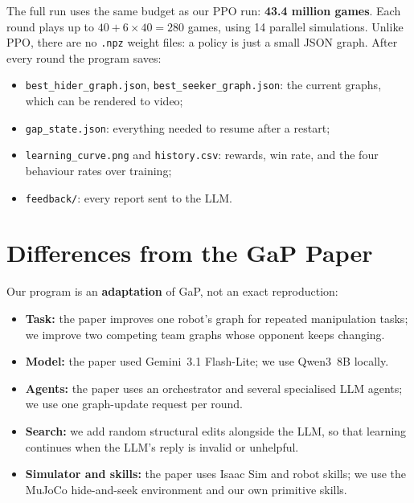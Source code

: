 \documentclass[11pt]{article}
\begin{document}
The full run uses the same budget as our PPO run: \textbf{43.4 million games}.
Each round plays up to $40 + 6 \times 40 = 280$ games, using 14 parallel
simulations. Unlike PPO, there are no \texttt{.npz} weight files: a policy is just
a small JSON graph. After every round the program saves:
\begin{itemize}
  \item \texttt{best\_hider\_graph.json}, \texttt{best\_seeker\_graph.json}: the
  current graphs, which can be rendered to video;
  \item \texttt{gap\_state.json}: everything needed to resume after a restart;
  \item \texttt{learning\_curve.png} and \texttt{history.csv}: rewards, win rate,
  and the four behaviour rates over training;
  \item \texttt{feedback/}: every report sent to the LLM.
\end{itemize}

\section{Differences from the GaP Paper}

Our program is an \textbf{adaptation} of GaP, not an exact reproduction:
\begin{itemize}
  \item \textbf{Task:} the paper improves one robot's graph for repeated
  manipulation tasks; we improve two competing team graphs whose opponent keeps
  changing.
  \item \textbf{Model:} the paper used Gemini~3.1 Flash-Lite; we use Qwen3~8B
  locally.
  \item \textbf{Agents:} the paper uses an orchestrator and several specialised
  LLM agents; we use one graph-update request per round.
  \item \textbf{Search:} we add random structural edits alongside the LLM, so
  that learning continues when the LLM's reply is invalid or unhelpful.
  \item \textbf{Simulator and skills:} the paper uses Isaac Sim and robot skills;
  we use the MuJoCo hide-and-seek environment and our own primitive skills.
\end{itemize}
\end{document}
